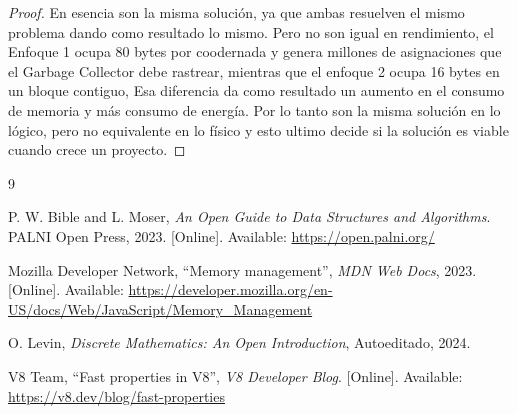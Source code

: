 \documentclass[11pt]{article}
\begin{document}
\begin{proof}\hspace{0pt}
   En esencia son la misma solución, ya que ambas resuelven el mismo problema dando como resultado lo mismo.
Pero no son igual en rendimiento, el Enfoque 1 ocupa 80 bytes por coodernada y genera millones de asignaciones que el Garbage Collector debe rastrear, mientras que el enfoque 2 ocupa 16 bytes en un bloque contiguo, Esa diferencia da como resultado un aumento en el consumo de memoria y más consumo de energía.
Por lo tanto son la misma solución en lo lógico, pero no equivalente en lo físico y esto ultimo decide si la solución es viable cuando crece un proyecto.

\end{proof}
\begin{thebibliography}{9}

 P. W. Bible and L. Moser, \emph{An Open Guide to Data Structures and Algorithms}. PALNI Open Press, 2023. [Online]. Available: \url{https://open.palni.org/}

 Mozilla Developer Network, ``Memory management'', \emph{MDN Web Docs}, 2023. [Online]. Available: \url{https://developer.mozilla.org/en-US/docs/Web/JavaScript/Memory_Management}

 O. Levin, \emph{Discrete Mathematics: An Open Introduction}, Autoeditado, 2024.

 V8 Team, ``Fast properties in V8'', \emph{V8 Developer Blog}. [Online]. Available: \url{https://v8.dev/blog/fast-properties}

\end{thebibliography}
\end{document}
